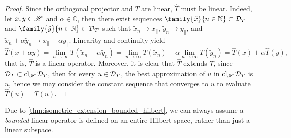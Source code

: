 \begin{proof}
    Since the orthogonal projector and \(T\) are linear, \(\hat{T}\) must be linear. Indeed, let \(x, y \in \mathscr{H}\) and \(\alpha \in \mathbb{C}\), then there exist sequences \(\family{\tilde{x}}{n \in \mathbb{N}} \subset \domain{T}\) and \(\family{\tilde{y}}{n\in \mathbb{N}} \subset \domain{T}\) such that \(\tilde{x}_n \to x_\parallel\), \(\tilde{y}_n \to y_\parallel\), and \(\tilde{x}_n + \alpha \tilde{y}_n \to x_\parallel + \alpha y_\parallel\). Linearity and continuity yield
    \begin{equation*}
        \hat{T}(x + \alpha y) = \lim_{n \to \infty}{T(\tilde{x}_n + \alpha \tilde{y}_n)}= \lim_{n \to \infty}{T(\tilde{x}_n)}+ \alpha \lim_{n\to\infty}{T(\tilde{y}_n)} = \hat{T}(x) + \alpha \hat{T}(y),
    \end{equation*}
    that is, \(\hat{T}\) is a linear operator. Moreover, it is clear that \(\hat{T}\) extends \(T\), since \(\mathcal{D}_{T} \subset \operatorname{cl}_{\mathscr{H}}{\mathcal{D}_{T}}\), then for every \(u \in \mathcal{D}_{T}\), the best approximation of \(u\) in \(\operatorname{cl}_{\mathscr{H}}{\mathcal{D}_{T}}\) is \(u\), hence we may consider the constant sequence that converges to \(u\) to evaluate \(\hat{T}(u) = T(u)\).
\end{proof}
Due to \cref{thm:isometric_extension_bounded_hilbert}, we can always assume a \emph{bounded} linear operator is defined on an entire Hilbert space, rather than just a linear subspace.

